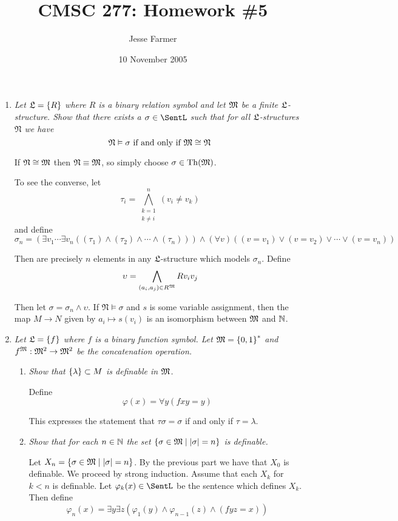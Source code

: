 \documentclass[10pt]{article}
\title{CMSC 277: Homework \#5}
\author{Jesse Farmer}
\date{10 November 2005}
\begin{document}
\maketitle

\begin{enumerate}
\item \emph{Let $\mathfrak{L} = \left\{ R \right\}$ where $R$ is a binary relation symbol and let $\mathfrak{M}$ be a finite $\mathfrak{L}$-structure.  Show that there exists a $\sigma \in \SentL$ such that for all $\mathfrak{L}$-structures $\mathfrak{N}$ we have $$\mathfrak{N} \vDash \sigma \mbox{ if and only if } \mathfrak{M} \cong \mathfrak{N}$$}


If $\mathfrak{N} \cong \mathfrak{M}$ then $\mathfrak{N} \equiv \mathfrak{M}$, so simply choose $\sigma \in \operatorname{Th}(\mathfrak{M})$.

To see the converse, let $$\tau_i = \bigwedge_{\substack{k=1 \\ k \neq i}}^n (v_i \neq v_k)$$ and define
\[
\sigma_n = (\exists v_1 \cdots \exists v_n ((\tau_1) \land (\tau_2) \land \cdots \land (\tau_n))) \land (\forall v)((v = v_1) \lor (v = v_2) \lor \cdots \lor (v = v_n))
\]

Then are precisely $n$ elements in any $\mathfrak{L}$-structure which models $\sigma_n$.  Define
\[
\upsilon = \bigwedge_{(a_i, a_j) \in R^{\mathfrak{M}}} Rv_iv_j
\]

Then let $\sigma = \sigma_n \land \upsilon$.  If $\mathfrak{N} \vDash \sigma$ and $s$ is some variable assignment, then the map $M \to N$ given by $a_i \mapsto s(v_i)$ is an isomorphism between $\mathfrak{M}$ and $\mathbb{N}$.

\item \emph{Let $\mathfrak{L}=\left\{ f \right\}$ where $f$ is a binary function symbol.  Let $\mathfrak{M} = \left\{ 0,1 \right\}^\ast$ and $f^{\mathfrak{M}} : \mathfrak{M}^2 \to \mathfrak{M}^2$ be the concatenation operation.}
\begin{enumerate}
\item \emph{Show that $\left\{ \lambda \right\} \subset M$ is definable in $\mathfrak{M}$.}

Define $$\varphi(x) = \forall y (fxy = y)$$

This expresses the statement that $\tau\sigma = \sigma$ if and only if $\tau = \lambda$.

\item \emph{Show that for each $n \in \mathbb{N}$ the set $\left\{ \sigma \in \mathfrak{M} \mid \left| \sigma \right| = n \right\}$ is definable.}

Let $X_n = \left\{ \sigma \in \mathfrak{M} \mid \left| \sigma \right| = n \right\}$.  By the previous part we have that $X_0$ is definable.  We proceed by strong induction.  Assume that each $X_k$ for $k < n$ is definable.  Let $\varphi_k(x) \in \SentL$ be the sentence which defines $X_k$.  Then define
\[
\varphi_n(x) = \exists y \exists z (\varphi_1(y) \land \varphi_{n-1}(z) \land (fyz = x))
\]


\end{enumerate}
\end{enumerate}
\end{document}
